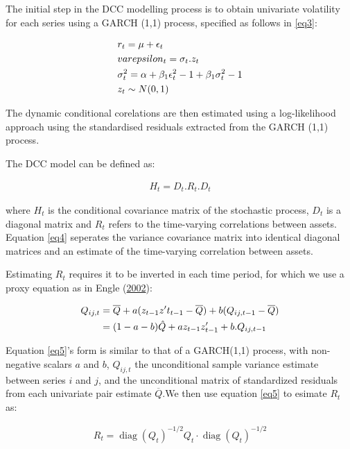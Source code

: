\documentclass[11pt,preprint, authoryear]{elsarticle}
\numberwithin{equation}{section}
\numberwithin{figure}{section}
\numberwithin{table}{section}
\begin{document}
The initial step in the DCC modelling process is to obtain univariate
volatility for each series using a GARCH (1,1) process, specified as
follows in \ref{eq3}:

\begin{align} 
  &r_t = \mu + \epsilon_t   \label{eq3}    \\ \notag 
  &varepsilon_t = \sigma_t . z_t \\ \notag
  &\sigma^2_t = \alpha + \beta_1 \epsilon^2_t-1 + \beta_1\sigma^2_t-1 \\ \notag
  &z_t \sim N(0,1) \notag
\end{align}

The dynamic conditional corelations are then estimated using a
log-likelihood approach using the standardised residuals extracted from
the GARCH (1,1) process.

The DCC model can be defined as:

\begin{align}
H_t = D_t.R_t.D_t \label{eq4}
\end{align}

where \(H_t\) is the conditional covariance matrix of the stochastic
process, \(D_t\) is a diagonal matrix and \(R_t\) refers to the
time-varying correlations between assets. Equation \ref{eq4} seperates
the variance covariance matrix into identical diagonal matrices and an
estimate of the time-varying correlation between assets.

Estimating \(R_t\) requires it to be inverted in each time period, for
which we use a proxy equation as in Engle
(\protect\hyperlink{ref-engle2002}{2002}):

\begin{align}
Q _ { i j ,t } &= \overline { Q } + a ( z _ { t - 1} z ^ { \prime } t _ { t - 1} - \overline { Q } ) + b ( Q _ { i j ,t - 1} - \overline { Q } )   \label{eq5} \\ \notag
 &= ( 1- a - b ) \hat { Q } + a z _ { t - 1} z _ { t - 1} ^ { \prime } + b .Q _ { i j ,t - 1} \notag
\end{align}

Equation \ref{eq5}'s form is similar to that of a GARCH(1,1) process,
with non-negative scalars \(a\) and \(b\), \(Q _ { i j ,t }\) the
unconditional sample variance estimate between series \(i\) and \(j\),
and the unconditional matrix of standardized residuals from each
univariate pair estimate \(\overline { Q }\).We then use equation
\ref{eq5} to esimate \(R_t\) as:

\begin{align}
R _ { t } = \operatorname{diag} ( Q _ { t } ) ^ { - 1/ 2} Q _ { t } \cdot \operatorname{diag} ( Q _ { t } ) ^ { - 1/ 2} \label{eq6}
\end{align}
\end{document}
